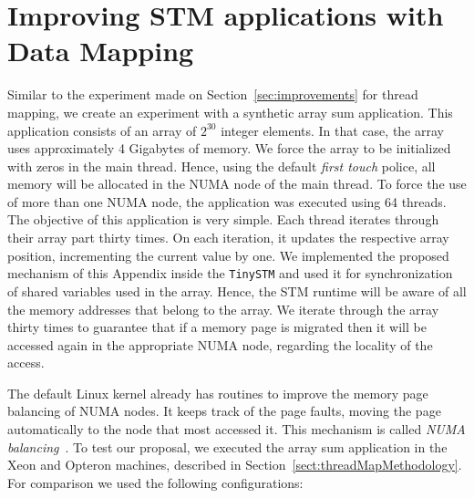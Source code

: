 \section{Improving STM applications with Data Mapping}\label{sect:dataMappingProof}

Similar to the experiment made on Section~\ref{sec:improvements} for thread mapping, we create an experiment with a synthetic array sum application. This application consists of an array of $2^{30}$ integer elements. In that case, the array uses approximately 4 Gigabytes of memory. We force the array to be initialized with zeros in the main thread. Hence, using the default \emph{first touch} police, all memory will be allocated in the NUMA node of the main thread. To force the use of more than one NUMA node, the application was executed using 64 threads. The objective of this application is very simple. Each thread iterates through their array part thirty times. On each iteration, it updates the respective array position, incrementing the current value by one. We implemented the proposed mechanism of this Appendix inside the \texttt{TinySTM} and used it for synchronization of shared variables used in the array. 
Hence, the STM runtime will be aware of all the memory addresses that belong to the array. We iterate through the array thirty times to guarantee that if a memory page is migrated then it will be accessed again in the appropriate NUMA node, regarding the locality of the access.

The default Linux kernel already has routines to improve the memory page balancing of NUMA nodes. It keeps track of the page faults, moving the page automatically to the node that most accessed it. This mechanism is called \emph{NUMA balancing}~\cite{NumaB:2020}. To test our proposal, we executed the array sum application in the Xeon and Opteron machines, described in Section~\ref{sect:threadMapMethodology}. For comparison we used the following configurations:

